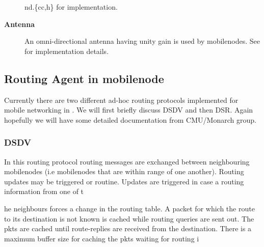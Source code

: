 \begin{description}
{nd.\{cc,h\}} for implementation.

\item[{\bf Antenna}] An omni-directional antenna having unity gain is used by mobilenodes. See  for implementation details.
\end{description}

\subsection{Routing Agent in mobilenode}
\label{sec:mobilenode-routing}

Currently there are two different ad-hoc routing protocols implemented for mobile networking in \ns. We will first briefly discuss DSDV and then DSR. Again hopefully we will have some detailed documentation from CMU/Monarch group.

\subsubsection{DSDV}
\label{sec:dsdv}

In this routing protocol routing messages are exchanged between neighbouring mobilenodes (i.e mobilenodes that are within range of one another). Routing updates may be triggered or routine. Updates are triggered in case a routing information from one of t





















he neighbours forces a change in the routing table.
A packet for which the route to its destination is not known is cached while routing queries are sent out. The pkts are cached until route-replies are received from the destination. There is a maximum buffer size for caching the pkts waiting for routing i





















